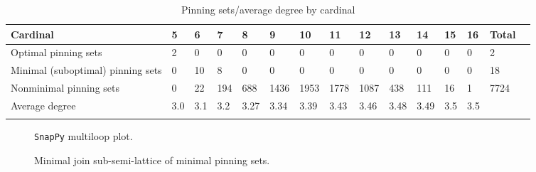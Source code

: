 \documentclass{article}%
\begin{document}
\begin{table}[ht]
	\caption{Pinning sets/average degree by cardinal}
	\centering
	\renewcommand{\arraystretch}{1.5}
	\begin{tabularx}{\textwidth}{lXXXXXXXXXXXXXX}
		\toprule
			Cardinal & 5 & 6 & 7 & 8 & 9 & 10 & 11 & 12 & 13 & 14 & 15 & 16 & Total\\
			\hline
			Optimal pinning sets & 2 & 0 & 0 & 0 & 0 & 0 & 0 & 0 & 0 & 0 & 0 & 0 & 2 \\
			Minimal (suboptimal) pinning sets & 0 & 10 & 8 & 0 & 0 & 0 & 0 & 0 & 0 & 0 & 0 & 0 & 18 \\
			Nonminimal pinning sets & 0 & 22 & 194 & 688 & 1436 & 1953 & 1778 & 1087 & 438 & 111 & 16 & 1 & 7724 \\
			Average degree & 3.0 & 3.1 & 3.2 & 3.27 & 3.34 & 3.39 & 3.43 & 3.46 & 3.48 & 3.49 & 3.5 & 3.5 &  \\
		\bottomrule \\ 
	\end{tabularx}
\end{table}

\begin{multicols}{2}
\begin{figure}[H]
\centering

\caption{\texttt{SnapPy} multiloop plot.}
\label{fig:tex/img/[[6, 10, 1, 7], [7, 11, 8, 18], [5, 24, 6, 19], [9, 12, 10, 13], [1, 12, 2, 11], [8, 2, 9, 3], [17, 19, 18, 20], [4, 16, 5, 17], [23, 28, 24, 25], [13, 28, 14, 27], [3, 21, 4, 20], [15, 25, 16, 26], [.svg}
\end{figure}
\columnbreak

\begin{figure}[H]
\centering
\scalebox{0.8}{}
\caption{Minimal join sub-semi-lattice of minimal pinning sets.}
\label{fig:tex/img/[[6, 10, 1, 7], [7, 11, 8, 18], [5, 24, 6, 19], [9, 12, 10, 13], [1, 12, 2, 11], [8, 2, 9, 3], [17, 19, 18, 20], [4, 16, 5, 17], [23, 28, 24, 25], [13, 28, 14, 27], [3, 21, 4, 20], [15, 25, 16, 26], [.pgf}
\end{figure}
\end{multicols}
\end{document}
